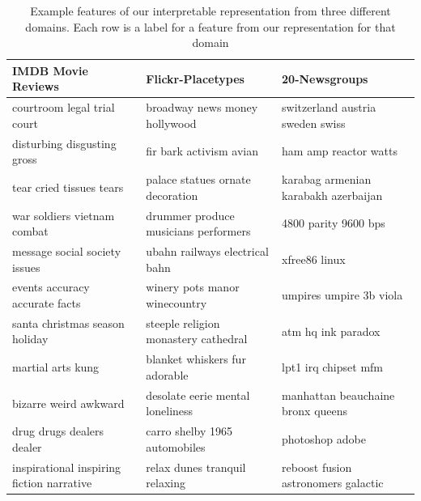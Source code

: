 \begin{table}[] 
	\scriptsize
	\begin{tabular}{lll}                                                                   
		\textbf{IMDB Movie Reviews}                                 & \textbf{Flickr-Placetypes}           & \textbf{20-Newsgroups}                           \\
		\toprule
		courtroom legal trial court                                 & broadway news money hollywood        & switzerland austria sweden swiss     \\
		disturbing disgusting gross                                 & fir bark activism avian              & ham amp reactor watts                \\
		tear cried tissues tears                                    & palace statues ornate decoration     & karabag armenian karabakh azerbaijan \\
		war soldiers vietnam combat                                 & drummer produce musicians performers & 4800 parity 9600 bps                 \\
		message social society issues                               & ubahn railways electrical bahn       & xfree86 linux                        \\
		events accuracy accurate facts                              & winery pots manor winecountry        & umpires umpire 3b viola              \\
		santa christmas season holiday                              & steeple religion monastery cathedral & atm hq ink paradox                   \\
		martial arts kung                                           & blanket whiskers fur adorable        & lpt1 irq chipset mfm                 \\
		bizarre weird awkward                                       & desolate eerie mental loneliness     & manhattan beauchaine bronx queens    \\
		drug drugs dealers dealer                                   & carro shelby 1965 automobiles        & photoshop adobe                      \\
		inspirational inspiring fiction narrative                   & relax dunes tranquil relaxing        & reboost fusion astronomers galactic 
	\end{tabular}  
\caption{Example features of our interpretable representation from three different domains. Each row is a label for a feature from our representation for that domain}\label{ch3:ExampleRep}    
\end{table}   

